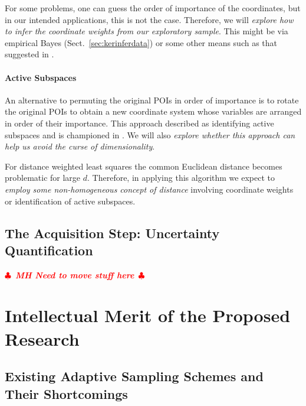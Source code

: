 \documentclass[11pt]{NSFamsart}
\newif\ifnotesw \noteswtrue
\newcommand{\notes}[1]{\ifnotesw \textcolor{red}{  $\clubsuit$\ {\sf \bf \it  #1}\ $\clubsuit$  }\fi}
\begin{document}
For some problems, one can guess the order of importance of the coordinates, but in our intended applications, this is not the case.  Therefore, we will \emph{explore how to infer the coordinate weights from our exploratory sample}.  This might be via empirical Bayes (Sect.\ \ref{sec:kerinferdata}) or some other means such as that suggested in \cite{DinHic20a}.

\paragraph*{Active Subspaces}
An alternative to permuting the original POIs in order of importance is to rotate the original POIs to obtain a new coordinate system whose variables are arranged in order of their importance.  This approach described as identifying active subspaces and is championed in \cite{constantine2015active}.  We will also \emph{explore whether this approach can help us avoid the curse of dimensionality}.

For distance weighted least squares the common Euclidean distance becomes problematic for large $d$.  Therefore, in applying this algorithm we expect to \emph{employ some non-homogeneous concept of distance} involving coordinate weights or identification of active subspaces.


\subsection{The Acquisition Step:  Uncertainty Quantification}

\notes{MH Need to move stuff here}

\section{Intellectual Merit of the Proposed Research} \label{sec:Proposed}

\subsection{Existing Adaptive Sampling Schemes and Their Shortcomings} \label{sec:shortExist}
\end{document}
